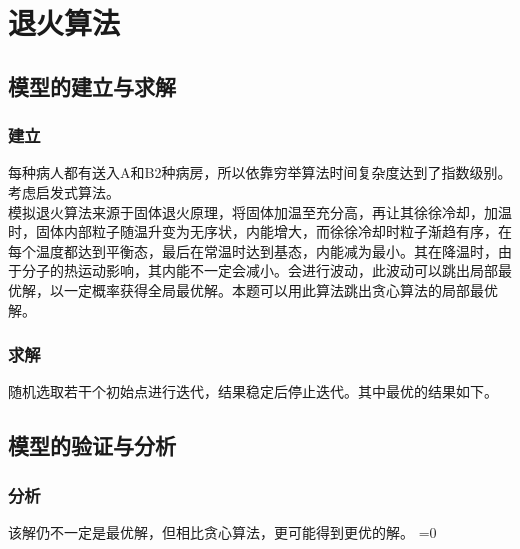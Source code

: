 \documentclass{article}
\begin{document}
\fi
\clearpage
\section{退火算法}
\subsection{模型的建立与求解}
\subsubsection{建立}
每种病人都有送入A和B2种病房，所以依靠穷举算法时间复杂度达到了指数级别。考虑启发式算法。
\\\indent 模拟退火算法来源于固体退火原理，将固体加温至充分高，再让其徐徐冷却，加温时，固体内部粒子随温升变为无序状，内能增大，而徐徐冷却时粒子渐趋有序，在每个温度都达到平衡态，最后在常温时达到基态，内能减为最小。其在降温时，由于分子的热运动影响，其内能不一定会减小。会进行波动，此波动可以跳出局部最优解，以一定概率获得全局最优解。本题可以用此算法跳出贪心算法的局部最优解。
\subsubsection{求解}
随机选取若干个初始点进行迭代，结果稳定后停止迭代。其中最优的结果如下。
\subsection{模型的验证与分析}
\subsubsection{分析}
该解仍不一定是最优解，但相比贪心算法，更可能得到更优的解。
\ifnum{}=0
	
\end{document}
